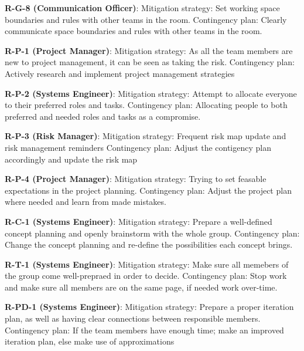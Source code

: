 \textbf{R-G-8 (Communication Officer)}:
\newline Mitigation strategy: Set working space boundaries and rules with other teams in the room.
\newline Contingency plan: Clearly communicate space boundaries and rules with other teams in the room.

\textbf{R-P-1 (Project Manager)}:
\newline Mitigation strategy: As all the team members are new to project management, it can be seen as taking the risk.
\newline Contingency plan: Actively research and implement project management strategies

\textbf{R-P-2 (Systems Engineer)}:
\newline Mitigation strategy: Attempt to allocate everyone to their preferred roles and tasks.
\newline Contingency plan: Allocating people to both preferred and needed roles and tasks as a compromise.

\textbf{R-P-3 (Risk Manager)}:
\newline Mitigation strategy: Frequent risk map update and risk management reminders
\newline Contingency plan: Adjust the contigency plan accordingly and update the risk map

\textbf{R-P-4 (Project Manager)}:
\newline Mitigation strategy: Trying to set feasable expectations in the project planning.
\newline Contingency plan: Adjust the project plan where needed and learn from made mistakes.

\textbf{R-C-1 (Systems Engineer)}:
\newline Mitigation strategy: Prepare a well-defined concept planning and openly brainstorm with the whole group.
\newline Contingency plan: Change the concept planning and re-define the possibilities each concept brings.

\textbf{R-T-1 (Systems Engineer)}:
\newline Mitigation strategy: Make sure all memebers of the group come well-prepraed in order to decide.
\newline Contingency plan: Stop work and make sure all members are on the same page, if needed work over-time.

\textbf{R-PD-1 (Systems Engineer)}:
\newline Mitigation strategy: Prepare a proper iteration plan, as well as having clear connections between responsible members.
\newline Contingency plan: If the team members have enough time; make an improved iteration plan, else make use of approximations

